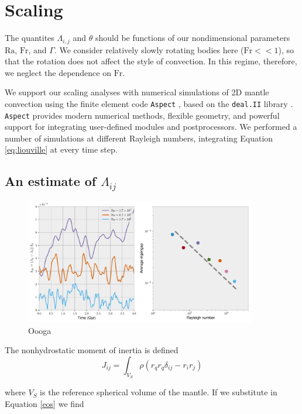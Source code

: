 \documentclass[extra,onecolumn]{gji}
\begin{document}
\section{Scaling}
\label{sec:scaling}

The quantites $\Lambda_{i,j}$ and $\theta$ should be functions of our nondimensional parameters $\mathrm{Ra}$, $\mathrm{Fr}$, and $\Gamma$.  
We consider relatively slowly rotating bodies here ($\mathrm{Fr} << 1$), so that the rotation does not affect the style of convection.  
In this regime, therefore, we neglect the dependence on $\mathrm{Fr}$.

We support our scaling analyses with numerical simulations of 2D mantle convection using the finite element code \texttt{Aspect} \citep{kronbichler2012high}, based on the \texttt{deal.II} library \citep{dealII81}.  
\texttt{Aspect} provides modern numerical methods, flexible geometry, and powerful support for integrating user-defined modules and postprocessors.
We performed a number of simulations at different Rayleigh numbers, integrating Equation \ref{eq:liouville} at every time step.

\subsection{An estimate of $\Lambda_{ij}$}

\begin{figure}
\centering
\label{misfit}
\includegraphics[width=0.9\textwidth]{figures/eigengap.pdf}
\caption{Oooga}
\end{figure}

The nonhydrostatic moment of inertia is defined
\begin{equation}
J_{ij} = \int_{V_S} \rho \left( r_q r_q \delta_{ij} - r_i r_j \right) 
\end{equation}

where $V_S$ is the reference spherical volume of the mantle.
If we substitute in Equation \ref{eos} we find
\end{document}
